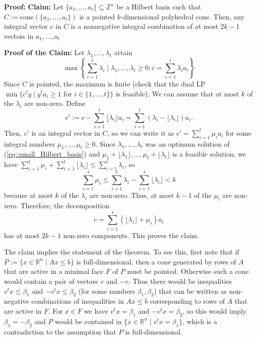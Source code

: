 \documentclass[12pt, showidx, twoside]{article}
\def\prove{\par \noindent \hbox{\bf Proof:}\quad}
\def\R{\mathbb{R}}
\def\Z{\mathbb{Z}}
\begin{document}
{{\prove %
{\bf Claim:} Let $\{a_1,\dots,a_t\} \subseteq \Z^n$ be a Hilbert basis such that 
$C := \text{cone}(\{a_1,\dots,a_t\})$ is a pointed $k$-dimensional polyhedral cone.
Then, any integral vector
$c$ in $C$ is a nonnegative integral combination
of at most $2k-1$ vectors in $a_1,\dots,a_t$

{\bf Proof of the Claim:}
Let $\lambda_1,\dots,\lambda_t$ attain 
\begin{equation}\label{eq::small_Hilbert_basis}
   \max\left\{\sum_{i=1}^{t} \lambda_i \mid \lambda_1,\dots,\lambda_t \geq 0; c= \sum_{i=1}^t\lambda_i a_i\right\}
\end{equation}
Since $C$ is pointed, the maximum is finite (check that the dual LP
$\min\{c^t y \mid y^t a_i \geq 1 \text{ for } i \in \{1,\dots,t\}\}$
is feasible).
We can assume that at most $k$ of the $\lambda_i$ are non-zero. Define
\[
   c' := c - \sum_{i=1}^t \lfloor \lambda_i \rfloor a_i 
       = \sum_{i=1}^t (\lambda_i - \lfloor \lambda_i \rfloor) a_i.
\]
Then, $c'$ is an integral vector in $C$, so we can write it as
$ c' = \sum_{i=1}^t \mu_i a_i$
for some integral numbers $\mu_1,\dots,\mu_t \geq 0$.
Since $\lambda_1,\dots,\lambda_t$ was an optimum solution of 
(\ref{eq::small_Hilbert_basis}) and 
$\mu_1 + \lfloor \lambda_1 \rfloor, \dots, \mu_t + \lfloor \lambda_t \rfloor$ is
a feasible solution, we have 
$\sum_{i=1}^t \mu_i + \sum_{i=1}^t \lfloor \lambda_i \rfloor \leq \sum_{i=1}^t \lambda_i$,
so
\[
   \sum_{i=1}^t \mu_i \leq  \sum_{i=1}^t \lambda_i - \sum_{i=1}^t \lfloor \lambda_i \rfloor < k
\]
because at most $k$ of the $\lambda_i$ are non-zero. Thus, at most $k-1$ of the
$\mu_i$ are non-zero. Therefore, the decomposition
\[
   c = \sum_{i=1}^t (\lfloor \lambda_i \rfloor + \mu_i) a_i
\]
has at most $2k - 1$ non-zero components.
This proves the claim.

The claim implies the statement of the theorem. To see this, first note that
if $P := \{x \in \R^n \mid Ax \leq b\}$ is full-dimensional, then a cone generated
by rows of $A$ that are active in a minimal face $F$ of $P$ 
must be pointed. Otherwise such a cone would contain a pair of vectors $v$ and $-v$.
Thus there would be inequalities
$v^t x \leq \beta_1$ and $-v^t x \leq \beta_2$ (for some numbers
$\beta_1,\beta_2$) that can be written as non-negative combinations of 
inequalities in $Ax \leq b$ corresponding to rows of $A$ that are active in $F$.
For $x \in F$ we have 
$v^t x = \beta_1$ and $-v^t x = \beta_2$, 
so this would imply $\beta_1 = -\beta_2$
and $P$ would be contained in $\{x \in \R^n \mid v^t x = \beta_1\}$,
which is a contradiction to the assumption that $P$ is full-dimensional.

}}
\end{document}
